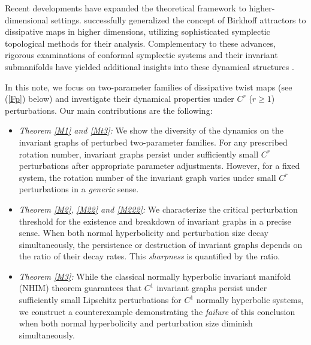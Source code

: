 \documentclass{amsart}
\theoremstyle{definition}
\begin{document}

Recent developments have expanded the theoretical framework to higher-dimensional settings. \cite{AHV} successfully generalized the concept of Birkhoff attractors to dissipative maps in higher dimensions, utilizing sophisticated symplectic topological methods for their analysis. Complementary to these advances, rigorous examinations of conformal symplectic systems and their invariant submanifolds have yielded additional insights into these dynamical structures \cite{AA,AF}.
	
	

In this note, we focus on two-parameter families of dissipative twist maps  (see (\ref{Fp}) below) and investigate their dynamical properties under $C^r$ ($r \geq 1$) perturbations. Our main contributions are the following:

\begin{itemize}
    \item {\it  Theorem \ref{M1} and \ref{Mt3}:} We show the diversity of the dynamics on the invariant graphs of perturbed two-parameter families. For any prescribed rotation number, invariant graphs persist under sufficiently small $C^r$  perturbations after appropriate parameter adjustments. However, for a fixed system, the rotation number of the invariant graph  varies under small $C^r$ perturbations in a {\it generic} sense.


    \item {\it  Theorem \ref{M2}, \ref{M22} and \ref{M222}:} We characterize the critical perturbation threshold for the existence and breakdown of invariant graphs in a precise sense. When both normal hyperbolicity and perturbation size decay simultaneously, the persistence or destruction of invariant graphs depends on the ratio of their decay rates. This {\it sharpness} is  quantified by the ratio.

        \item {\it  Theorem \ref{M3}:} While the classical normally hyperbolic invariant manifold (NHIM) theorem \cite[Page 52, Remark 2]{HPS} guarantees that $C^1$ invariant graphs persist under sufficiently small Lipschitz perturbations for $C^1$ normally hyperbolic systems, we construct a  counterexample demonstrating the {\it failure} of this conclusion when both normal hyperbolicity and perturbation size diminish simultaneously.

\end{itemize}
\end{document}
